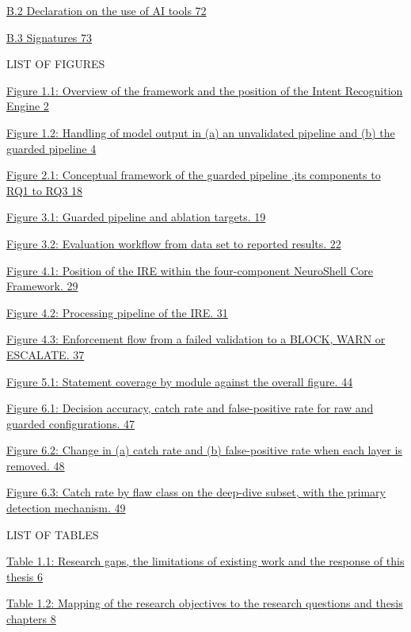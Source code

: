 \documentclass[
]{article}
\begin{document}
\protect\hyperlink{b.2-declaration-on-the-use-of-ai-tools}{B.2
Declaration on the use of AI tools 72}

\protect\hyperlink{b.3-signatures}{B.3 Signatures 73}

\protect\hypertarget{_Toc900003}{}{}LIST OF FIGURES

\protect\hyperlink{_Toc900009}{Figure 1.1: Overview of the framework and
the position of the Intent Recognition Engine 2}

\protect\hyperlink{_Toc900012}{Figure 1.2: Handling of model output in
(a) an unvalidated pipeline and (b) the guarded pipeline 4}

\protect\hyperlink{_Toc900039}{Figure 2.1: Conceptual framework of the
guarded pipeline ,its components to RQ1 to RQ3 18}

\protect\hyperlink{_Toc900044}{Figure 3.1: Guarded pipeline and ablation
targets. 19}

\protect\hyperlink{_Toc900050}{Figure 3.2: Evaluation workflow from data
set to reported results. 22}

\protect\hyperlink{_Toc900067}{Figure 4.1: Position of the IRE within
the four-component NeuroShell Core Framework. 29}

\protect\hyperlink{_Toc900071}{Figure 4.2: Processing pipeline of the
IRE. 31}

\protect\hyperlink{_Toc900088}{Figure 4.3: Enforcement flow from a
failed validation to a BLOCK, WARN or ESCALATE. 37}

\protect\hyperlink{_Toc900113}{Figure 5.1: Statement coverage by module
against the overall figure. 44}

\protect\hyperlink{_Toc900120}{Figure 6.1: Decision accuracy, catch rate
and false-positive rate for raw and guarded configurations. 47}

\protect\hyperlink{_Toc900123}{Figure 6.2: Change in (a) catch rate and
(b) false-positive rate when each layer is removed. 48}

\protect\hyperlink{_Toc900125}{Figure 6.3: Catch rate by flaw class on
the deep-dive subset, with the primary detection mechanism. 49}

\protect\hypertarget{_Toc900004}{}{}LIST OF TABLES

\protect\hyperlink{_Toc900014}{Table 1.1: Research gaps, the limitations
of existing work and the response of this thesis 6}

\protect\hyperlink{_Toc900017}{Table 1.2: Mapping of the research
objectives to the research questions and thesis chapters 8}
\end{document}
